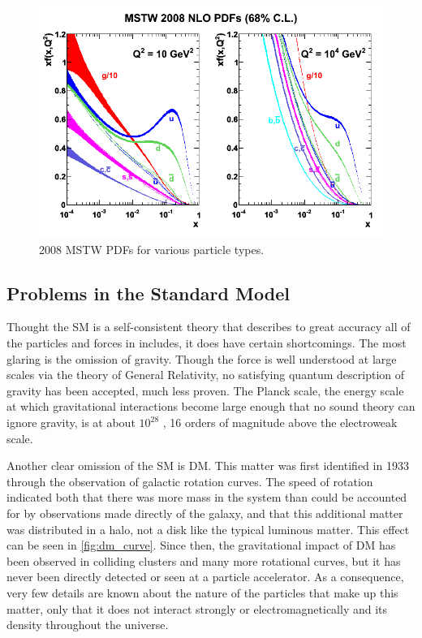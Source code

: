 \begin{centering}
\begin{figure}[bth]
\myfloatalign
\includegraphics[width=.85\linewidth]{figures/theory/mstw2008nlo68cl_allpdfs.png}
\caption{2008 MSTW \acp{PDF} for various particle types. \cite{0901.0002}}
\label{fig:pdf}
\end{figure}
\end{centering}




\subsection{Problems in the Standard Model}
\label{sec:sm_problems}

Thought the \ac{SM} is a self-consistent theory that describes to great accuracy all of the particles and forces in includes, it does have certain shortcomings. The most glaring is the omission of gravity. Though the force is well understood at large scales via the theory of General Relativity, no satisfying quantum description of gravity has been accepted, much less proven. The Planck scale, the energy scale at which gravitational interactions become large enough that no sound theory can ignore gravity, is at about $10^28$ \eV,  16 orders of magnitude above the electroweak scale. 

Another clear omission of the \ac{SM} is \ac{DM}. This matter was first identified in 1933 through the observation of galactic rotation curves. \cite{zwicky} The speed of rotation indicated both that there was more mass in the system than could be accounted for by observations made directly of the galaxy, and that this additional matter was distributed in a halo, not a disk like the typical luminous matter. This effect can be seen in \autoref{fig:dm_curve}. Since then, the gravitational impact of \ac{DM} has been observed in colliding clusters and many more rotational curves, but it has never been directly detected or seen at a particle accelerator. As a consequence, very few details are known about the nature of the particles that make up this matter, only that it does not interact strongly or electromagnetically and its density throughout the universe. 

